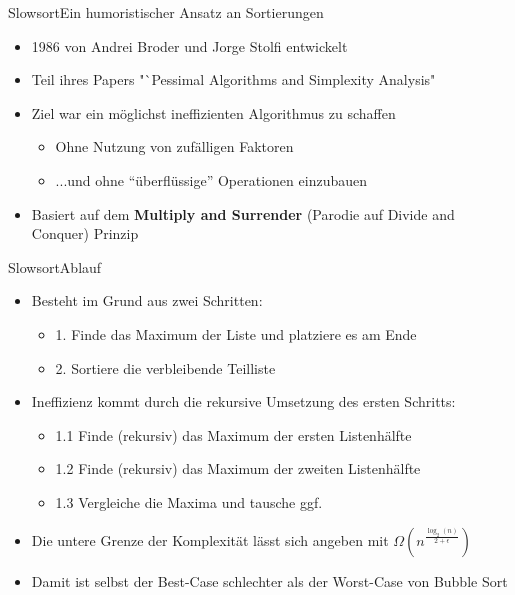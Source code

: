 \begin{frame}{Slowsort}{Ein humoristischer Ansatz an Sortierungen}
    \begin{itemize}
        \item 1986 von Andrei Broder und Jorge Stolfi entwickelt
        \item Teil ihres Papers "`Pessimal Algorithms and Simplexity Analysis"
        \item Ziel war ein möglichst ineffizienten Algorithmus zu schaffen
        \begin{itemize}
            \item Ohne Nutzung von zufälligen Faktoren
            \item ...und ohne "`überflüssige"' Operationen einzubauen
        \end{itemize}
        \item Basiert auf dem \textbf{Multiply and Surrender} (Parodie auf Divide and Conquer) Prinzip
    \end{itemize}
\end{frame}

\begin{frame}{Slowsort}{Ablauf}
    \begin{itemize}
        \item Besteht im Grund aus zwei Schritten:
        \begin{itemize}
            \item 1. Finde das Maximum der Liste und platziere es am Ende
            \item 2. Sortiere die verbleibende Teilliste
        \end{itemize}
        \item Ineffizienz kommt durch die rekursive Umsetzung des ersten Schritts:
        \begin{itemize}
            \item 1.1 Finde (rekursiv) das Maximum der ersten Listenhälfte
            \item 1.2 Finde (rekursiv) das Maximum der zweiten Listenhälfte
            \item 1.3 Vergleiche die Maxima und tausche ggf.
        \end{itemize}
        \item Die untere Grenze der Komplexität lässt sich angeben mit $\Omega (n^{\frac{\log_2(n)}{2+\epsilon}})$
        \item Damit ist selbst der Best-Case schlechter als der Worst-Case von Bubble Sort
    \end{itemize}
\end{frame}